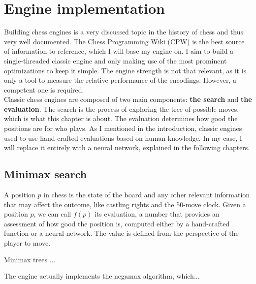 \section{Engine implementation}

Building chess engines is a very discussed topic in the history of chess and thus very well documented. The Chess Programming Wiki (CPW) \cite{cpw} is the best source of information to reference, which I will base my engine on. I aim to build a single-threaded classic engine and only making use of the most prominent optimizations to keep it simple. The engine strength is not that relevant, as it is only a tool to measure the relative performance of the encodings. However, a competent one is required. \\

Classic chess engines are composed of two main components: \textbf{the search} and \textbf{the evaluation}. The search is the process of exploring the tree of possible moves, which is what this chapter is about. The evaluation determines how good the positions are for who plays. As I mentioned in the introduction, classic engines used to use hand-crafted evaluations based on human knowledge. In my case, I will replace it entirely with a neural network, explained in the following chapters.

\subsection{Minimax search}

A position $p$ in chess is the state of the board and any other relevant information that may affect the outcome, like castling rights and the 50-move clock. Given a position $p$, we can call $f(p)$ its evaluation, a number that provides an assessment of how good the position is, computed either by a hand-crafted function or a neural network. The value is defined from the perspective of the player to move.

Minimax trees \cite{minimax-survey:1995} ...


The engine actually implements the negamax algorithm, which...

